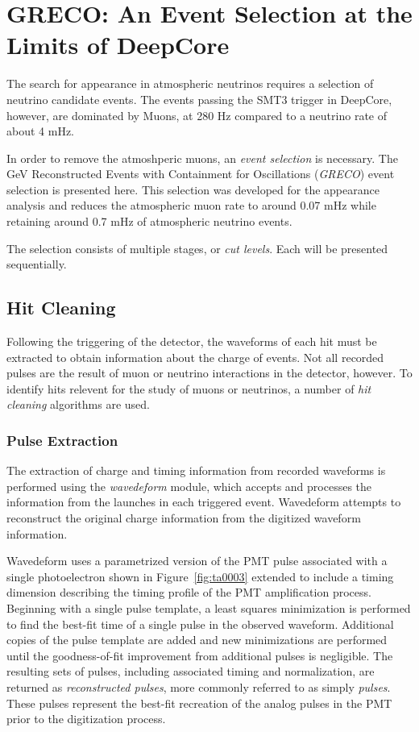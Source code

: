 \chapter{GRECO: An Event Selection at the Limits of DeepCore}
The search for appearance in atmospheric neutrinos requires a selection of neutrino candidate events.
The events passing the SMT3 trigger in DeepCore, however, are dominated by Muons, at 280 Hz \cite{Description-IceCube} compared to a neutrino rate of about 4 mHz.

In order to remove the atmoshperic muons, an \emph{event selection} is necessary.
The GeV Reconstructed Events with Containment for Oscillations (\emph{GRECO}) event selection is presented here.
This selection was developed for the appearance analysis and reduces the atmospheric muon rate to around 0.07 mHz while retaining around 0.7 mHz of atmospheric neutrino events.

The selection consists of multiple stages, or \emph{cut levels}.
Each will be presented sequentially.

\section{Hit Cleaning}
Following the triggering of the detector, the waveforms of each hit must be extracted to obtain information about the charge of events.
Not all recorded pulses are the result of muon or neutrino interactions in the detector, however.
To identify hits relevent for the study of muons or neutrinos, a number of \emph{hit cleaning} algorithms are used.

\subsection{Pulse Extraction}
The extraction of charge and timing information from recorded waveforms is performed using the \emph{wavedeform} module, which accepts and processes the information from the launches in each triggered event.
Wavedeform attempts to reconstruct the original charge information from the digitized waveform information.

Wavedeform uses a parametrized version of the PMT pulse associated with a single photoelectron shown in Figure~\ref{fig:ta0003} extended to include a timing dimension describing the timing profile of the PMT amplification process. 
Beginning with a single pulse template, a least squares minimization is performed to find the best-fit time of a single pulse in the observed waveform.
Additional copies of the pulse template are added and new minimizations are performed until the goodness-of-fit improvement from additional pulses is negligible.
The resulting sets of pulses, including associated timing and normalization, are returned as \emph{reconstructed pulses}, more commonly referred to as simply \emph{pulses}.
These pulses represent the best-fit recreation of the analog pulses in the PMT prior to the digitization process.

